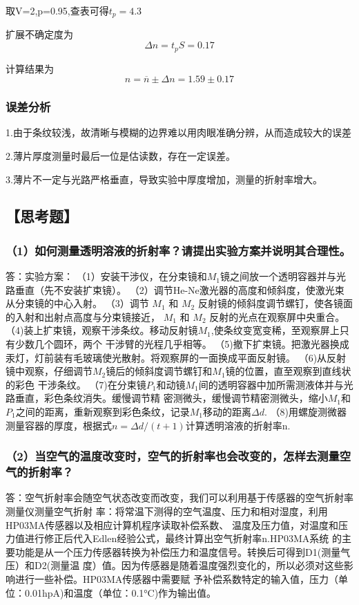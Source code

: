 \documentclass[12pt,a4paper,UTF8]{ctexart}
\begin{document}
取V=2,p=0.95,查表可得$t_p=4.3$

扩展不确定度为
\begin{equation*}
	\varDelta n=t_p S =0.17
\end{equation*}

计算结果为
\begin{equation*}
	n=\overline{n} \pm \varDelta n=1.59\pm0.17
\end{equation*}

\subsubsection*{误差分析}
1.由于条纹较浅，故清晰与模糊的边界难以用肉眼准确分辨，从而造成较大的误差

2.薄片厚度测量时最后一位是估读数，存在一定误差。

3.薄片不一定与光路严格垂直，导致实验中厚度增加，测量的折射率增大。


\newpage
\subsection*{【思考题】}
\subsubsection*{（1）如何测量透明溶液的折射率？请提出实验方案并说明其合理性。}
答：实验方案：
（1）安装干涉仪，在分束镜和$M_1$镜之间放一个透明容器并与光路垂直（先不安装扩束镜）。
（2）调节He-Ne激光器的高度和倾斜度，使激光束从分束镜的中心入射。
（3）调节 $M_1$ 和 $M_2$ 反射镜的倾斜度调节螺钉，使各镜面的入射和出射点高度与分束镜接近， $M_1$ 和 $M_2$
反射的光点在观察屏中央重合。
（4)装上扩束镜，观察干涉条纹。移动反射镜$M_1$,使条纹变宽变稀，至观察屏上只有少数几个圆环，两个
干涉臂的光程几乎相等。
（5)撤下扩束镜。把激光器换成汞灯，灯前装有毛玻璃使光散射。将观察屏的一面换成平面反射镜。
（6)从反射镜中观察，仔细调节$M_2$镜后的倾斜度调节螺钉和$M_1$镜的位置，直至观察到直线状的彩色
干涉条纹。
（7)在分束镜$P_1$和动镜$M_1$间的透明容器中加所需测液体并与光路垂直，彩色条纹消失。缓慢调节精
密测微头，缓慢调节精密测微头，缩小$M_1$和$P_1$之间的距离，重新观察到彩色条纹，记录$M_1$移动的距离$\varDelta d$.
（8)用螺旋测微器测量容器的厚度，根据式$n=\varDelta d/(t+1)$计算透明溶液的折射率n.

\subsubsection*{（2）当空气的温度改变时，空气的折射率也会改变的，怎样去测量空气的折射率？}
答：空气折射率会随空气状态改变而改变，我们可以利用基于传感器的空气折射率测量仪测量空气折射
率：将常温下测得的空气温度、压力和相对湿度，利用HP03MA传感器以及相应计算机程序读取补偿系数、
温度及压力值，对温度和压力值进行修正后代入Edlen经验公式，最终计算出空气折射率n.HP03MA系统
的主要功能是从一个压力传感器转换为补偿压力和温度信号。转换后可得到D1(测量气压）和D2(测量温
度）值。因为传感器是随着温度强烈变化的，所以必须对这些影响进行一些补偿。HP03MA传感器中需要赋
予补偿系数特定的输入值，压力（单位：0.01hpA)和温度（单位：0.1°C)作为输出值。
\end{document}

